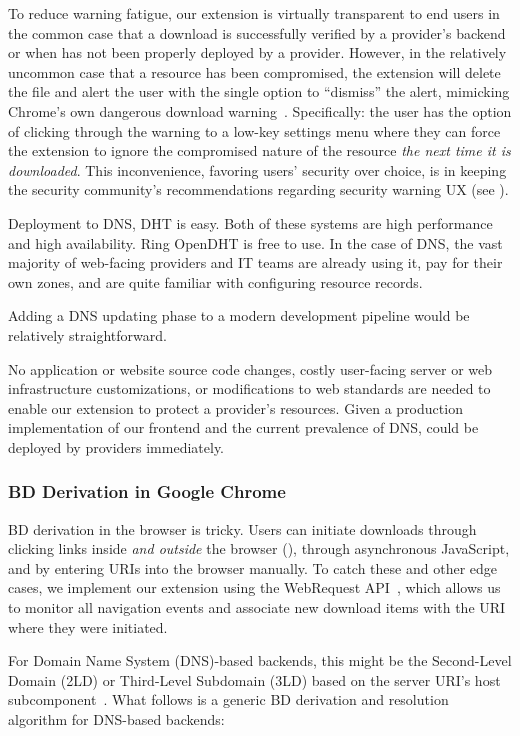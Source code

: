 To reduce warning fatigue, our extension is virtually transparent to end users
in the common case that a download is successfully verified by a provider's
backend or when \SYSTEM{} has not been properly deployed by a provider. However,
in the relatively uncommon case that a resource has been compromised, the
extension will delete the file and alert the user with the single option to
``dismiss'' the alert, mimicking Chrome's own dangerous download
warning~\cite{ChromeClickThrough}. Specifically: the user has the option of
clicking through the warning to a low-key settings menu where they can force the
extension to ignore the compromised nature of the resource \emph{the next time
it is downloaded}. This inconvenience, favoring users' security over choice, is
in keeping the security community's recommendations regarding security warning
UX (see ).

Deployment to DNS, DHT is easy. Both of these systems are high performance and
high availability. Ring OpenDHT is free to use. In the case of DNS, the vast
majority of web-facing providers and IT teams are already using it, pay for
their own zones, and are quite familiar with configuring resource records.

Adding a DNS updating phase to a modern development pipeline would be relatively
straightforward.

No application or website source code changes, costly user-facing server or web
infrastructure customizations, or modifications to web standards are needed to
enable our extension to protect a provider's resources. Given a production
implementation of our frontend and the current prevalence of DNS, \SYSTEM{}
could be deployed by providers immediately.

\subsubsection{BD Derivation in Google Chrome}

BD derivation in the browser is tricky. Users can initiate downloads through
clicking links inside \emph{and outside} the browser (), through asynchronous JavaScript, and by entering URIs into the
browser manually. To catch these and other edge cases, we implement our
extension using the WebRequest API~\cite{ExtensionAPI}, which allows us to
monitor all navigation events and associate new download items with the URI
where they were initiated.

For Domain Name System (DNS)-based backends, this might be the Second-Level
Domain (2LD) or Third-Level Subdomain (3LD) based on the server URI's host
subcomponent~\cite{RFC3986}. What follows is a generic BD derivation and
resolution algorithm for DNS-based backends:

